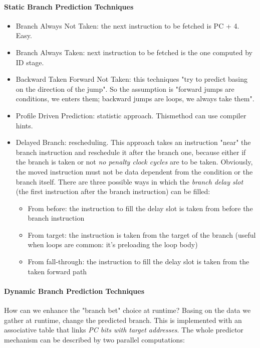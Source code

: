 \documentclass[10pt,a4paper]{article}
\begin{document}
					\paragraph{Static Branch Prediction Techniques} 
						\begin{itemize}
							\item Branch Always Not Taken: the next instruction to be fetched is PC + 4. Easy.
							\item Branch Always Taken: next instruction to be fetched is the one computed by ID stage.
							\item Backward Taken Forward Not Taken: this techniques "try to predict basing on the direction of the jump". So the assumption is "forward jumps are conditions, we enters them; backward jumps are loops, we always take them".
							\item Profile Driven Prediction: statistic approach. Thismethod can use compiler hints.
							\item Delayed Branch: rescheduling. This approach takes an instruction "near" the branch instruction and reschedule it after the branch one, because either if the branch is taken or not \emph{no penalty clock cycles} are to be taken. Obviously, the moved instruction must not be data dependent from the condition or the branch itself. There are three possible ways in which the \emph{branch delay slot} (the first instruction after the branch instruction) can be filled:
								\begin{itemize}
									\item From before: the instruction to fill the delay slot is taken from before the branch instruction
									\item From target: the instruction is taken from the target of the branch (useful when loops are common: it's preloading the loop body)
									\item From fall-through: the instruction to fill the delay slot is taken from the taken forward path
								\end{itemize}
						\end{itemize}
						
					\paragraph{Dynamic Branch Prediction Techniques}
						How can we enhance the "branch bet" choice at runtime? Basing on the data we gather at runtime, change the predicted branch. This is implemented with an associative table that links \emph{PC bits with target addresses}. The whole predictor mechanism can be described by two parallel computations:
						
\end{document}
